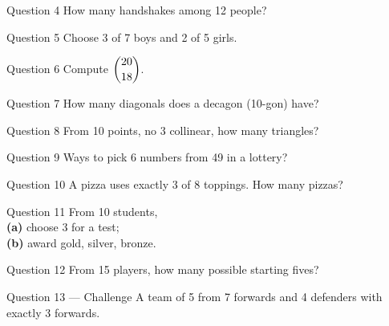 \documentclass[11pt]{article}
\begin{document}
\begin{qbox}{Question 4}
How many handshakes among 12 people?\workspace{2.4cm}
\end{qbox}

\begin{qbox}{Question 5}
Choose 3 of 7 boys and 2 of 5 girls.\workspace{2.4cm}
\end{qbox}

\begin{qbox}{Question 6}
Compute $\dbinom{20}{18}$.\workspace{2.4cm}
\end{qbox}

\begin{qbox}{Question 7}
How many diagonals does a decagon (10-gon) have?\workspace{2.4cm}
\end{qbox}

\begin{qbox}{Question 8}
From 10 points, no 3 collinear, how many triangles?\workspace{2.4cm}
\end{qbox}

\begin{qbox}{Question 9}
Ways to pick 6 numbers from 49 in a lottery?\workspace{2.4cm}
\end{qbox}

\begin{qbox}{Question 10}
A pizza uses exactly 3 of 8 toppings. How many pizzas?\workspace{2.4cm}
\end{qbox}

\begin{qbox}{Question 11}
From 10 students, \\ \textbf{(a)} choose 3 for a test; \\ \textbf{(b)} award gold, silver, bronze.\workspace{2.4cm}
\end{qbox}

\begin{qbox}{Question 12}
From 15 players, how many possible starting fives?\workspace{2.4cm}
\end{qbox}

\begin{qbox}{Question 13 --- Challenge}
A team of 5 from 7 forwards and 4 defenders with exactly 3 forwards.\workspace{3cm}
\end{qbox}

\clearpage
{}
\end{document}
